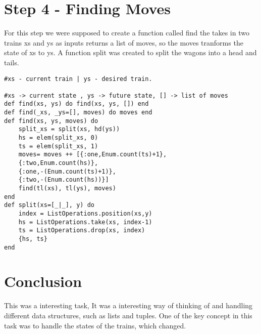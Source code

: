 \documentclass[a4paper,11pt]{article}
\begin{document}
\section{Step 4 - Finding Moves}
For this step we were supposed to create a function called find the takes in two trains xs and ys as inputs returns a list of moves, so the moves tranforms the state of xs to ys. A function split was created to split the wagons into a head and tails.

\begin{verbatim}  
#xs - current train | ys - desired train.

#xs -> current state , ys -> future state, [] -> list of moves
def find(xs, ys) do find(xs, ys, []) end 
def find(_xs, _ys=[], moves) do moves end
def find(xs, ys, moves) do
    split_xs = split(xs, hd(ys))
    hs = elem(split_xs, 0)
    ts = elem(split_xs, 1)
    moves= moves ++ [{:one,Enum.count(ts)+1}, 
    {:two,Enum.count(hs)}, 
    {:one,-(Enum.count(ts)+1)}, 
    {:two,-(Enum.count(hs))}]
    find(tl(xs), tl(ys), moves)
end
def split(xs=[_|_], y) do
    index = ListOperations.position(xs,y)
    hs = ListOperations.take(xs, index-1)
    ts = ListOperations.drop(xs, index)
    {hs, ts}
end
\end{verbatim}

\section{Conclusion}
This was a interesting task, It was a interesting way of thinking of and handling different data structures, such as lists and tuples. One of the key concept in this task was to handle the states of the trains, which changed.
\end{document}
